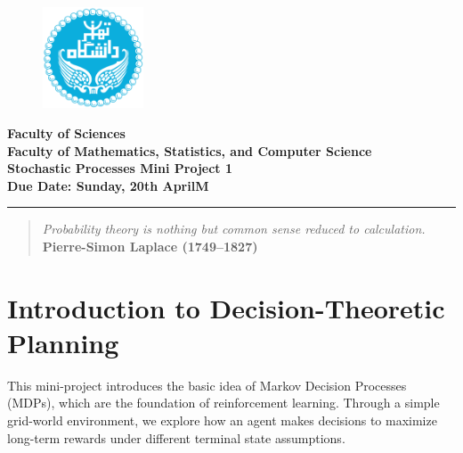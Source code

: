 \documentclass[12pt]{extreport}
\theoremstyle{definition}
\begin{document}
\begin{figure}[H]
    \centering
    \includegraphics[height=3cm]{Logo.png} %
\end{figure}

\begin{center}
    \textbf{\Large Faculty of Sciences}\\
    \textbf{\large Faculty of Mathematics, Statistics, and Computer Science}\\[0.3cm]
    \textbf{\LARGE Stochastic Processes Mini Project 1}\\
    \vspace{0.2cm}
    \textbf{Due Date: Sunday, 20th AprilM}\\
    \rule{\textwidth}{0.4pt}
\end{center}

\vspace{1cm}

\begin{quote}
    \centering
    \emph{Probability theory is nothing but common sense reduced to calculation.}\\[1ex]
    \textbf{Pierre-Simon Laplace (1749--1827)}
\end{quote}

\vspace{1.0cm}

\section*{Introduction to Decision-Theoretic Planning}

This mini-project introduces the basic idea of Markov Decision Processes (MDPs), which are the foundation of reinforcement learning. Through a simple grid-world environment, we explore how an agent makes decisions to maximize long-term rewards under different terminal state assumptions.
\end{document}
